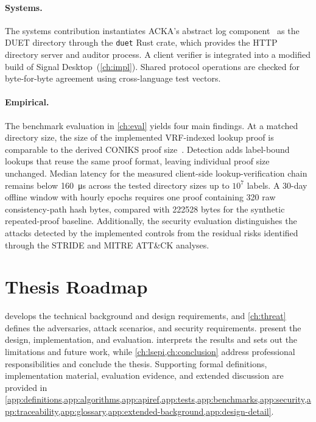 \paragraph{Systems.} The systems contribution instantiates ACKA's abstract log
component~\cite{dowling2023acka} as the DUET directory through the \texttt{duet} Rust crate,
which provides the HTTP directory server and auditor process. A
client verifier is integrated into a modified build of Signal Desktop~(\cref{ch:impl}). Shared protocol
operations are checked for byte-for-byte agreement using cross-language test vectors.

\paragraph{Empirical.} The benchmark evaluation in \cref{ch:eval} yields four main findings. At a matched directory size,
the size of the implemented VRF-indexed lookup proof is comparable to
the derived CONIKS proof size~\cite{melara2015coniks}. Detection adds label-bound lookups that reuse the same proof format,
leaving individual proof size unchanged. Median latency for the measured client-side
lookup-verification chain remains below \SI{160}{\micro\second} across the tested directory sizes
up to $10^7$ labels. A 30-day offline window with hourly epochs requires
one proof containing \num{320} raw
consistency-path hash bytes, compared with \num{222528} bytes for the synthetic repeated-proof
baseline. Additionally, the security evaluation distinguishes the attacks detected by the
implemented controls from the residual risks identified through the STRIDE and MITRE ATT\&CK
analyses.

\section{Thesis Roadmap}\label{sec:intro-roadmap}

 develops the technical background and design requirements, and \cref{ch:threat}
defines the adversaries, attack scenarios, and security requirements. 
present the design, implementation, and evaluation.  interprets the results and
sets out the limitations and future work, while \cref{ch:lsepi,ch:conclusion} address professional
responsibilities and conclude the thesis. Supporting formal definitions, implementation material,
evaluation evidence, and extended discussion are provided in
\cref{app:definitions,app:algorithms,app:apiref,app:tests,app:benchmarks,app:security,app:traceability,app:glossary,app:extended-background,app:design-detail}.
